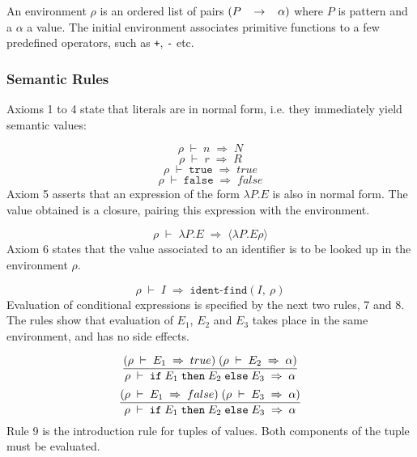 \documentclass[10pt]{article}
\begin{document}
An environment $\rho{}$ is an ordered list of pairs ${\mathrm\mathbf{}(}P\;\;\;\rightarrow{}\;\;\;\alpha{}{\mathrm\mathbf{})}$ where $P$ is pattern and a $\alpha{}$ a value. The initial
environment associates primitive functions to a few predefined
operators, such as \texttt{+}, \texttt{-} etc. 

\subsubsection*{Semantic Rules}
Axioms 1 to 4 state that literals are in normal form, i.e. they immediately yield semantic values: 

\begin{equation}
\rho{}\;\vdash{}\;n\;\Rightarrow{}\;N\end{equation}
\begin{equation}
\rho{}\;\vdash{}\;r\;\Rightarrow{}\;R\end{equation}
\begin{equation}
\rho{}\;\vdash{}\;\texttt{true}\;\Rightarrow{}\;true\end{equation}
\begin{equation}
\rho{}\;\vdash{}\;\texttt{false}\;\Rightarrow{}\;false\end{equation}
Axiom 5 asserts that an expression of the form $\lambda{}P.E$ is also in normal form. The
value obtained is a closure, pairing this expression with the
environment. 

\begin{equation}
\rho{}\;\vdash{}\;\lambda{}P.E\;\Rightarrow{}\;\langle{}\lambda{}P.E\rho{}\rangle{}\end{equation}
Axiom 6 states that the value associated to an identifier is to be looked up in the environment $\rho{}$. 

\begin{equation}
\rho{}\;\vdash{}\;I\;\Rightarrow{}\;\texttt{ident-find}(I,\:\rho{})\end{equation}
Evaluation of conditional expressions is specified by the next two
rules, 7 and 8. The rules show that evaluation of $E_{1}$, $E_{2}$ and $E_{3}$ takes place in the same
environment, and has no side effects. 

\begin{equation}
\frac{{\mathrm\mathbf{}(}\rho{}\;\vdash{}\;E_{1}\;\Rightarrow{}\;true{\mathrm\mathbf{})}\;{\mathrm\mathbf{}(}\rho{}\;\vdash{}\;E_{2}\;\Rightarrow{}\;\alpha{}{\mathrm\mathbf{})}}%
{\rho{}\;\vdash{}\;\texttt{if}\;E_{1}\;\texttt{then}\;E_{2}\;\texttt{else}\;E_{3}\;\Rightarrow{}\;\alpha{}}\end{equation}
\begin{equation}
\frac{{\mathrm\mathbf{}(}\rho{}\;\vdash{}\;E_{1}\;\Rightarrow{}\;false{\mathrm\mathbf{})}\;{\mathrm\mathbf{}(}\rho{}\;\vdash{}\;E_{3}\;\Rightarrow{}\;\alpha{}{\mathrm\mathbf{})}}%
{\rho{}\;\vdash{}\;\texttt{if}\;E_{1}\;\texttt{then}\;E_{2}\;\texttt{else}\;E_{3}\;\Rightarrow{}\;\alpha{}}\end{equation}
Rule 9 is the introduction rule for tuples of values. Both components of the tuple must be evaluated. 
\end{document}

